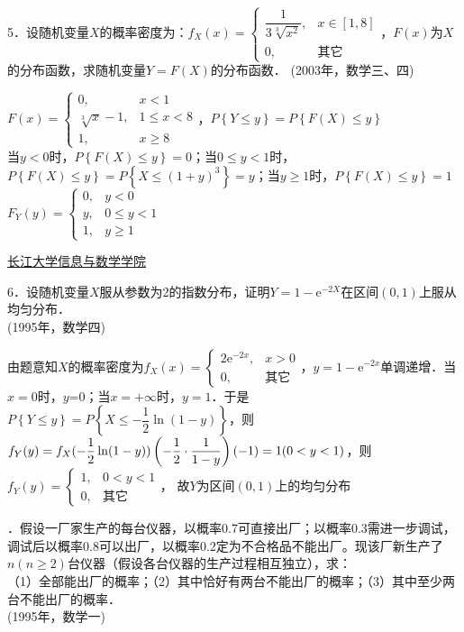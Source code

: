 \documentclass{ctexart}
\newcommand{\oldpaper}
{
	\newpage
	{\large\noindent\uline{\text{《概率论与数理统计》习题册} \hfill 长江大学信息与数学学院}}\par\noindent
}
\newcommand{\shortlabel}[1]
{
	\hfill
	{\small(#1)}\ignorespaces
}
\newcommand{\longlabel}[1]
{
	\\
	\hspace*{0mm}
	\hfill
	{\small(#1)}\ignorespaces
}
\newenvironment{answer}
{
	\begin{mdframed}[backgroundcolor=gray!40, hidealllines=true, skipabove=0pt, skipbelow=0pt]
	\noindent\ignorespaces
}
{  
	\end{mdframed}
}
\begin{document}
5．设随机变量$X$的概率密度为：$f_X(x)=
\begin{cases}
\dfrac{1}{3\sqrt[3]{x^2}},&x\in\left[1,8\right]\\
0,&\text{其它}
\end{cases}$，$F(x)$为$X$的分布函数，求随机变量$Y=F(X)$的分布函数．\shortlabel{2003年，数学三、四}\par\medskip
\begin{answer}
$F(x)=
\begin{cases}
0,&x<1\\
\sqrt[3]{x}-1,&1\le x<8\\
1,&x\ge 8
\end{cases}$，$P\left\{Y\le y\right\}=P\left\{F(X)\le y\right\}$\\
当$y<0$时，$P\left\{F(X)\le y\right\}=0$；当$0\le y<1$时，$P\left\{F(X)\le y\right\}=P\left\{X\le (1+y)^3\right\}=y$；当$y\ge1$时，$P\left\{F(X)\le y\right\}=1$\\
$F_Y(y)=
\begin{cases}
0,&y<0\\
y,&0\le y<1\\
1,&y\ge1
\end{cases}$
\end{answer}
\oldpaper
6．设随机变量$X$服从参数为2的指数分布，证明$Y=1-\mathrm{e}^{-2X}$在区间$(0,1)$上服从均匀分布．\longlabel{1995年，数学四}\par\medskip
\begin{answer}
由题意知$X$的概率密度为$f_X(x)=
\begin{cases}
	2\mathrm{e}^{-2x}, &x>0\\
	0, &\text{其它}
\end{cases}$，$y=1-\mathrm{e}^{-2x}$单调递增．当$x=0$时，$y$=0；当$x=+\infty$时，$y=1$．于是$P\left\{Y\le y\right\}=P\left\{X\le-\dfrac{1}{2}\ln(1-y)\right\}$，则$f_Y(y)=f_X(-\dfrac{1}{2}\ln(1-y))\left(-\dfrac{1}{2}\cdot\dfrac{1}{1-y}\right)\\(-1)=1(0<y<1)$，则$f_Y(y)=
\begin{cases}
	1, &0<y<1\\
	0, &\text{其它}
\end{cases}$，
故$Y$为区间$(0,1)$上的均匀分布
\end{answer}
7．假设一厂家生产的每台仪器，以概率0.7可直接出厂；以概率0.3需进一步调试，调试后以概率0.8可以出厂，以概率0.2定为不合格品不能出厂。现该厂新生产了$n(n\ge2)$台仪器（假设各台仪器的生产过程相互独立），求：\\
（1）全部能出厂的概率；（2）其中恰好有两台不能出厂的概率；（3）其中至少两台不能出厂的概率．\longlabel{1995年，数学一}\par\medskip
\end{document}
